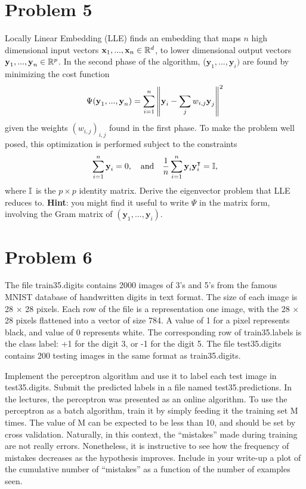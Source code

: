 \newpage
\section{Problem 5}
Locally Linear Embedding (LLE) finds an embedding that maps $n$ high dimensional input vectors $\textbf{x}_1, ..., \textbf{x}_n \in \mathbb{R}^d$, to lower dimensional output vectors $\textbf{y}_1, ..., \textbf{y}_n \in \mathbb{R}^p$. In the second phase of the algorithm, ($\textbf{y}_1, ..., \textbf{y}_i)$ are found by minimizing the cost function
\[\Psi(\textbf{y}_1, ..., \textbf{y}_n) = \sum_{i = 1}^n \norm{\textbf{y}_i - \sum_{j} w_{i, j}\textbf{y}_j}^2\]
given the weights $(w_{i, j})_{i, j}$ found in the first phase. To make the problem well posed, this optimization is performed subject to the constraints 
\[\sum_{i = 1}^n \textbf{y}_i = 0, \quad \text{and} \quad \frac{1}{n}\sum_{i = 1}^n \textbf{y}_i \textbf{y}_i ^{\intercal} = \mathbb{I}, \]
where $\mathbb{I}$ is the $p\times p$ identity matrix. Derive the eigenvector problem that LLE reduces to. \textbf{Hint}: you might find it useful to write $\Psi$ in the matrix form, involving the Gram matrix of $(\textbf{y}_1, ..., \textbf{y}_i)$.

\newpage
\section{Problem 6}
The file train35.digits contains 2000 images of 3’s and 5’s from the famous MNIST database of handwritten digits in text format. The size of each image is 28 × 28 pixels. Each row of the file is a representation one image, with the 28 × 28 pixels flattened into a vector of size 784. A value of 1 for a pixel represents black, and value of 0 represents white. The corresponding row of train35.labels is the class label: +1 for the digit 3, or -1 for the digit 5. The file test35.digits contains 200 testing images in the same format as train35.digits. 

\jump
Implement the perceptron algorithm and use it to label each test image in test35.digits. Submit the predicted labels in a file named test35.predictions. In the lectures, the perceptron was presented as an online algorithm. To use the perceptron as a batch algorithm, train it by simply feeding it the training set M times. The value of M can be expected to be less than 10, and should be set by cross validation. Naturally, in this context, the “mistakes” made during training are not really errors. Nonetheless, it is instructive to see how the frequency of mistakes decreases as the hypothesis improves. Include in your write-up a plot of the cumulative number of “mistakes” as a function of the number of examples seen.

